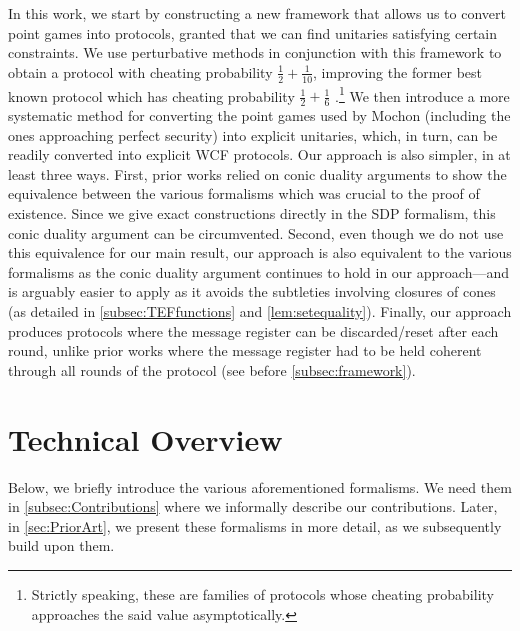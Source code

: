 \documentclass{article}
\begin{document}
%
In this work,
we start by constructing a new framework that allows us to convert point games into protocols, granted that we can find unitaries satisfying certain constraints. We use perturbative methods in conjunction with this framework to obtain a protocol with cheating probability $\frac{1}{2}+\frac{1}{10}$, improving the former best known protocol which has cheating probability $\frac{1}{2}+\frac{1}{6}$ \cite{Mochon05}.\footnote{Strictly speaking, these are families of protocols whose cheating probability approaches
  the said value asymptotically.} We then introduce a more systematic method for converting the point games used by Mochon (including the ones approaching perfect security) into explicit unitaries, which, in turn, can be readily converted
into explicit WCF protocols. %
  {%
    Our approach is also simpler, in at least three ways. First, prior works relied on conic duality arguments to show the equivalence between the various formalisms which was crucial to the proof of existence. Since we give exact constructions directly in the SDP formalism, this conic duality argument can be circumvented. Second, even though we do not use this equivalence for our main result, our approach is also equivalent to the various formalisms as the conic duality argument continues to hold in our approach---and is arguably easier to apply as it avoids the subtleties involving closures of cones (as detailed in \cref{subsec:TEFfunctions} and \cref{lem:setequality}). %
    Finally, our approach produces protocols where the message register can be discarded/reset after each round, unlike prior works where the message register had to be held coherent through all rounds of the protocol (see before \cref{subsec:framework}). }
%




\section{Technical Overview}
Below, we briefly introduce the various aforementioned formalisms. We need them in \cref{subsec:Contributions} where we informally describe our contributions. Later, in \cref{sec:PriorArt}, we present these formalisms in more detail, as we subsequently build upon them. %

%
%
%
\end{document}
